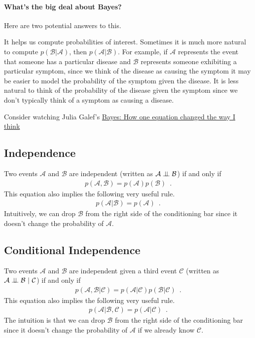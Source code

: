 \documentclass{tufte-handout}
\begin{document}
\paragraph{What's the big deal about Bayes?}
Here are two potential answers to this.
\bi
\item It helps us compute probabilities of interest.  Sometimes it is much more natural to compute $p(\mathcal{B} | \mathcal{A})$, then $p(\mathcal{A} | \mathcal{B})$.  For example, if $\mathcal{A}$ represents the event that someone has a particular disease and $\mathcal{B}$ represents someone exhibiting a particular symptom, since we think of the disease as causing the symptom it may be easier to model the probability of the symptom given the disease.  It is less natural to think of the probability of the disease given the symptom since we don't typically think of a symptom as causing a disease.
\item Consider watching Julia Galef's \href{https://www.youtube.com/watch?v=za7RqnT7CM0}{Bayes: How one equation changed the way I think}
\ei


\subsection{Independence}

Two events $\mathcal{A}$ and $\mathcal{B}$ are independent (written as $\mathcal{A} \perp\!\!\!\perp \mathcal{B}$) if and only if
\begin{align}
p(\mathcal{A}, \mathcal{B}) = p(\mathcal{A}) p(\mathcal{B}) \enspace .
\end{align}
This equation also implies the following very useful rule.
\begin{align}
p(\mathcal{A} | \mathcal{B}) = p(\mathcal{A}) \enspace .
\end{align}
Intuitively, we can drop $\mathcal{B}$ from the right side of the conditioning bar since it doesn't change the probability of $\mathcal{A}$.


\subsection{Conditional Independence}


Two events $\mathcal{A}$ and $\mathcal{B}$ are independent given a third event $\mathcal{C}$ (written as $\mathcal{A} \perp\!\!\!\perp \mathcal{B}~|~\mathcal{C}$) if and only if
\begin{align}
p(\mathcal{A}, \mathcal{B} | \mathcal{C}) = p(\mathcal{A} | \mathcal{C}) p(\mathcal{B} | \mathcal{C}) \enspace .
\end{align}
This equation also implies the following very useful rule.
\begin{align}
p(\mathcal{A} | \mathcal{B}, \mathcal{C}) = p(\mathcal{A} | \mathcal{C}) \enspace .
\end{align}
The intuition is that we can drop $\mathcal{B}$ from the right side of the conditioning bar since it doesn't change the probability of $\mathcal{A}$ if we already know $\mathcal{C}$.
\end{document}
